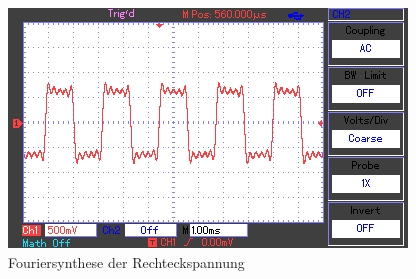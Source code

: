 	\begin{figure}[h]
		\begin{center}
		\includegraphics[scale=1.0]{picfsr.jpg}
		\caption{Fouriersynthese der Rechteckspannung}
		\label{picfsr}
		\end{center}	
	\end{figure}